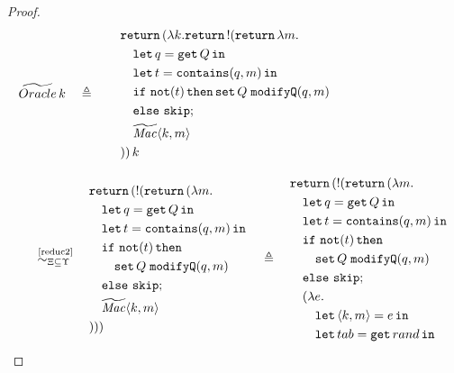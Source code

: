 \begin{proof}
\small{
\begin{align}
    &\widetilde{Oracle}\,k \quad\triangleq\quad
    \begin{aligned}
        &\quad \return(\lambda k.\return \bang(\return \lambda m. \\
        &\qquad \letin{q=\get Q}{} \\
        &\qquad \letin{t=\mathtt{contains}(q,m)}{} \\
        &\qquad \mathtt{if}\ \mathtt{not}(t)\,\mathtt{then} \, \mathtt{set}\,Q\;\mathtt{modifyQ}(q,m) \\
        &\qquad \mathtt{else}\ \mathtt{skip}; \\
        &\qquad \mathit{\widetilde{Mac}}\lis{k,m} \\
        &\quad))\,k
    \end{aligned} \nonumber
    \\[2ex]
    &\quad\overset{\text{~\ref{reduc2}}}{\simcontext}\quad
    \begin{aligned}
        &\return(\bang(\return(\lambda m. \\
        &\quad \letin{q=\get Q}{} \\
        &\quad \letin{t=\mathtt{contains}(q,m)}{} \\
        &\quad \mathtt{if}\ \mathtt{not}(t)\,\mathtt{then} \\ 
        &\quad\quad \mathtt{set}\,Q\;\mathtt{modifyQ}(q,m)\\
        &\quad \mathtt{else}\ \mathtt{skip}; \\
        &\quad \mathit{\widetilde{Mac}}\lis{k,m} \\
        &)))
    \end{aligned} \nonumber
    \quad\triangleq\quad
    \begin{aligned}
        &\return(\bang(\return(\lambda m. \\
        &\quad \letin{q=\get Q}{} \\
        &\quad \letin{t=\mathtt{contains}(q,m)}{} \\
        &\quad \mathtt{if}\ \mathtt{not}(t)\,\mathtt{then} \\ 
        &\qquad \mathtt{set}\,Q\;\mathtt{modifyQ}(q,m)\\
        &\quad \mathtt{else}\ \mathtt{skip}; \\
        &\quad (\lambda e. \\
        &\quad\quad\letin{\lis{k,m} = e}{} \\
        &\quad\quad\letin{tab = \mathtt{get}\,rand}{} \\

\end{aligned}
\end{align}}
\end{proof}
